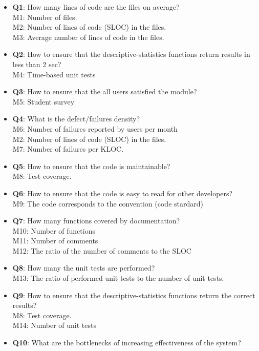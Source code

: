 \documentclass[12pt]{article}
\begin{document}
\begin{itemize}
    \item \textbf{Q1}: How many lines of code are the files on average?\\
     M1: Number of files.\\
     M2: Number of lines of code (SLOC) in the files.\\
     M3: Average number of lines of code in the files. 
    \item \textbf{Q2}: How to ensure that the descriptive-statistics functions return results in less than 2 sec? \\
     M4: Time-based unit tests
    \item \textbf{Q3}: How to ensure that the all users satisfied the module?\\
     M5: Student survey
    \item \textbf{Q4}: What is the defect/failures density?\\
     M6: Number of failures reported by users per month\\
     M2: Number of lines of code (SLOC) in the files.\\
     M7: Number of failures per KLOC.
    \item \textbf{Q5}: How to ensure that the code is maintainable?\\
     M8: Test coverage.
    \item \textbf{Q6}: How to ensure that the code is easy to read for other developers?\\
     M9: The code corresponds to the convention (code stardard)
    \item \textbf{Q7}: How many functions covered by documentation?\\
     M10: Number of functions\\
     M11: Number of comments\\
     M12: The ratio of the number of comments to the SLOC
    \item \textbf{Q8}: How many the unit tests are performed?\\
     M13: The ratio of performed unit tests to the number of unit tests.
    \item \textbf{Q9}: How to ensure that the descriptive-statistics functions return the correct results?\\
     M8: Test coverage.\\
     M14: Number of unit tests 
    \item \textbf{Q10}: What are the bottlenecks of increasing effectiveness of the system?\\

\end{itemize}
\end{document}
